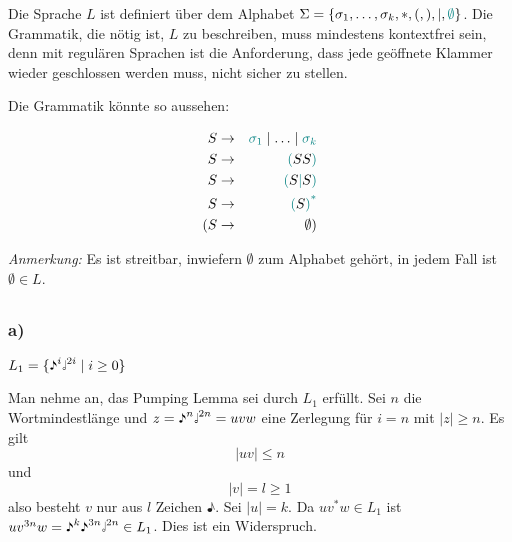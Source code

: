 \documentclass{article}
\begin{document}
   Die Sprache $L$ ist definiert \"uber dem Alphabet $\Sigma = \{\sigma_1,
      \ldots, \sigma_k, *, (, ), |, \textcolor{teal}{\emptyset}\}$.
   Die Grammatik, die n\"otig ist, $L$ zu beschreiben, muss mindestens
   kontextfrei sein, denn mit regul\"aren Sprachen ist die Anforderung, dass jede
   ge\"offnete Klammer wieder geschlossen werden muss, nicht sicher zu stellen.

   Die Grammatik k\"onnte so aussehen:

   \begin{eqnarray*}
      S & \rightarrow & \textcolor{teal}{\sigma_1} \mid \ldots \mid
      \textcolor{teal}{\sigma_k} \\ %
      S & \rightarrow & \textcolor{teal}{(} S S \textcolor{teal}{)} \\
      S & \rightarrow & \textcolor{teal}{(} S \textcolor{teal}{\mid} S \textcolor{teal}{)} \\
      S & \rightarrow &
      \textcolor{teal}{(}S\textcolor{teal}{)}\textsuperscript{\textcolor{teal}{*}}\\
      ( S & \rightarrow & \emptyset )
   \end{eqnarray*}
   
   \emph{Anmerkung:} Es ist streitbar, inwiefern $\emptyset$ zum Alphabet
   geh\"ort, in jedem Fall ist $\emptyset\in L$. 

   \subsection{} 
   
   \subsubsection{a)}

   \begin{center}
   $L_1 = \{\eighthnote^i\halfnote^{2i} \mid i \ge 0\}$
   \end{center}

   Man nehme an, das Pumping Lemma sei durch $L_1$ erf\"ullt. Sei $n$ die
   Wortmindestl\"ange und $z =\eighthnote^n\halfnote^{2n} = uvw$ eine Zerlegung f\"ur $i = n$ mit $|z| \ge
   n$. Es gilt
   \begin{equation*}
      | uv | \le n
   \end{equation*}
   und 
   \begin{equation*}
      | v| = l \ge 1
   \end{equation*}
   also besteht $v$ nur aus $l$ Zeichen $\eighthnote$. Sei $|u|=k$.
   Da $uv^*w \in L_1$ ist $uv^{3n}w = \eighthnote^k\eighthnote^{3n}\halfnote^{2n} \in L_1$.
   Dies ist ein Widerspruch.
\end{document}
